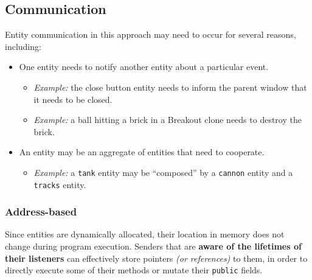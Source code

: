 \documentclass[twoside, 12pt, a4paper, openright]{book}
\providecommand{\tightlist}{%
  \setlength{\itemsep}{0pt}\setlength{\parskip}{0pt}}
\begin{document}
\hypertarget{chapter_oop_communication}{\subsection{Communication}\label{chapter_oop_communication}}

Entity communication in this approach may need to occur for several
reasons, including:

\begin{itemize}
\item
  One entity needs to notify another entity about a particular event.

  \begin{itemize}
  \item
    \emph{Example:} the close button entity needs to inform the parent
    window that it needs to be closed.
  \item
    \emph{Example:} a ball hitting a brick in a Breakout clone needs to
    destroy the brick.
  \end{itemize}
\item
  An entity may be an aggregate of entities that need to cooperate.

  \begin{itemize}
  \tightlist
  \item
    \emph{Example:} a
    \texttt{tank}
    entity may be ``composed'' by a
    \texttt{cannon}
    entity and a
    \texttt{tracks}
    entity.
  \end{itemize}
\end{itemize}

\subsubsection{Address-based}\label{address-based}

Since entities are dynamically allocated, their location in memory does
not change during program execution. Senders that are \textbf{aware of
the lifetimes of their listeners} can effectively store pointers
\emph{(or references)} to them, in order to directly execute some of
their methods or mutate their
\texttt{public}
fields.
\end{document}
